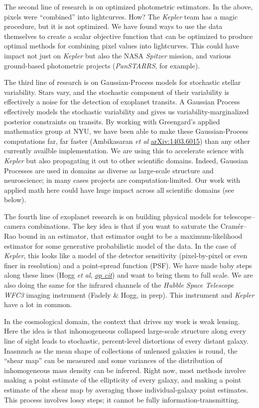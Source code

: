 \documentclass[11pt, letterpaper]{article}
\newcommand{\arxiv}[1]{\href{http://arxiv.org/abs/#1}{arXiv:#1}}
\newcommand{\opcit}[1]{\href{http://arxiv.org/abs/#1}{\textit{op cit}}}
\begin{document}
The second line of research is on optimized photometric estimators.
In the above, pixels were ``combined'' into lightcurves.
How?
The \textsl{Kepler} team has a magic procedure, but it is not optimized.
We have found ways to use the data themselves to create a scalar
objective function that can be optimized to produce optimal
methods for combining pixel values into lightcurves.
This could have impact not just on \textsl{Kepler} but also the NASA
\textsl{Spitzer} mission, and various ground-based photometric projects
(\textsl{PanSTARRS}, for example).

The third line of research is on Gaussian-Process models for
stochastic stellar variability.
Stars vary, and the stochastic component of their variability is
effectively a noise for the detection of exoplanet transits.
A Gaussian Process effectively models the stochastic variability and
gives us variability-marginalized posterior constraints on transits.
By working with Greengard's applied mathematics group at NYU, we have
been able to make these Gaussian-Process computations far, far faster
(Ambikasaran \textit{et al} \arxiv{1403.6015})
than any other currently availble implementation.
We are using this to accelerate science with \textsl{Kepler} but also
propagating it out to other scientific domains.
Indeed, Gaussian Processes are used in domains as diverse as
large-scale structure and neuroscience; in many cases projects are
computation-limited.
Our work with applied math here could have huge impact across all
scientific domains (see below).

The fourth line of exoplanet research is on building physical models for
telescope--camera combinations.
The key idea is that if you want to saturate the Cram\'er--Rao bound
in an estimator, that estimator ought to be a maximum-likelihood
estimator for some generative probabilistic model of the data.
In the case of \textsl{Kepler}, this looks like a model of the
detector sensitivity (pixel-by-pixel or even finer in resolution) and
a point-spread function (PSF).  
We have made baby steps along these lines
(Hogg \textit{et al}, \opcit{1403.6015})
and want to bring them to full scale.
We are also doing the same for the infrared channels of the
\textsl{Hubble Space Telescope} \textsl{WFC3} imaging instrument
(Fadely \& Hogg, in prep).
This instrument and \textsl{Kepler} have a lot in common.

In the cosmological domain, the context that drives my work is weak
lensing.
Here the idea is that inhomogeneous collapsed large-scale structure
along every line of sight leads to stochastic, percent-level
distortions of every distant galaxy.
Inasmuch as the mean shape of collections of unlensed galaxies is
round, the ``shear map'' can be measured and some variances of the
distribution of inhomogeneous mass density can be inferred.
Right now, most methods involve making a point estimate of the
ellipticity of every galaxy, and making a point estimate of the shear
map by averaging those individual-galaxy point estimates.
This process involves lossy steps; it cannot be fully
information-transmitting.
\end{document}
